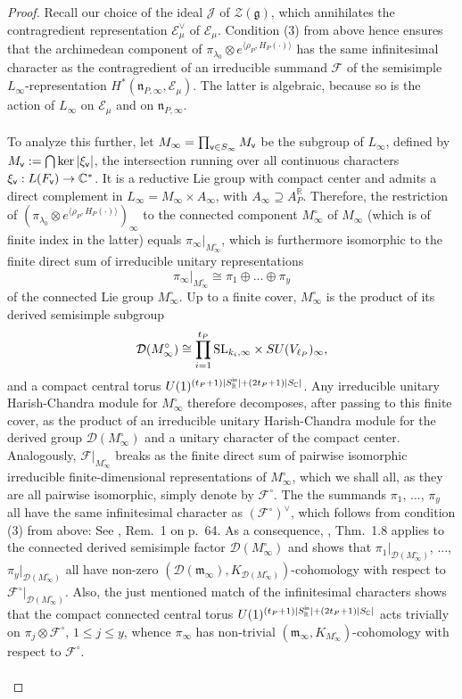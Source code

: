 \documentclass[a4paper,10pt]{amsart}
\theoremstyle{definition}
\numberwithin{equation}{section}
\def\R{\mathbb R}
\def\C{\mathbb C}
\def\EE{\mathcal E}
\def\cF{\mathcal F}
\def\g{\mathfrak g}
\def\n{\mathfrak n}
\def\m{\mathfrak m}
\def\vv{{\sf v}} %
\begin{document}
\begin{proof}
Recall our choice of the ideal $\mathcal J$ of $\mathcal Z(\g)$, which annihilates the contragredient representation $\EE_\mu^\vee$ of $\EE_\mu$. Condition (3) from above hence ensures that the archimedean component of $\pi_{\lambda_0}\otimes e^{\langle \rho_P,H_{P}(\cdot)\rangle}$ has the same infinitesimal character as the contragredient of an irreducible summand $\mathcal F$ of the semisimple $L_\infty$-representation $H^*(\n_{P,\infty},\EE_\mu)$. The latter is algebraic, because so is the action of $L_\infty$ on $\EE_\mu$ and on $\n_{P,\infty}$.\\\\ 
To analyze this further, let $M_\infty=\prod_{\vv\in S_\infty} M_\vv$ be the subgroup of $L_\infty$, defined by $M_\vv:=\bigcap \ker |\xi_\vv|$, the intersection running over all continuous characters $\xi_\vv:L(F_\vv)\rightarrow\C^*$. It is a reductive Lie group with compact center and admits a direct complement in $L_\infty=M_\infty\times A_\infty$, with $A_\infty\supseteq A_P^\R$. Therefore, the restriction of $(\pi_{\lambda_0}\otimes e^{\langle \rho_P,H_{P}(\cdot)\rangle})_\infty$ to the connected component $M_\infty^\circ$ of $M_\infty$ (which is of finite index in the latter) equals $\pi_\infty |_{M_\infty^\circ}$, which is furthermore isomorphic to the finite direct sum of irreducible unitary representations
$$\pi_\infty |_{M_\infty^\circ}\cong \pi_1\oplus...\oplus\pi_y$$
of the connected Lie group $M_\infty^\circ$. Up to a finite cover, $M^\circ_\infty$ is the product of its derived semisimple subgroup 
$$\mathcal D(M^\circ_\infty)\cong \prod_{i=1}^{t_P} {\rm SL}_{k_i,\infty}\times SU(V_{\ell_P})_\infty,$$ 
and a compact central torus $U(1)^{(t_P+1)|S^{\sf in}_\R|+(2t_P+1)|S_\C|}$. Any irreducible unitary Harish-Chandra module for $M^\circ_\infty$ therefore decomposes, after passing to this finite cover, as the product of an irreducible unitary Harish-Chandra module for the derived group $\mathcal D(M^\circ_\infty)$ and a unitary character of the compact center. Analogously, $\cF|_{M_\infty^\circ}$ breaks as the finite direct sum of pairwise isomorphic irreducible finite-dimensional representations of $M_\infty^{\circ}$, which we shall all, as they are all pairwise isomorphic, simply denote by $\cF^{\circ}$. The the summands $\pi_1$, ..., $\pi_y$ all have the same infinitesimal character as $(\cF^\circ)^\vee$, which follows from condition (3) from above: See \cite{bowa}, Rem.\ 1 on p.\ 64. As a consequence, \cite{salamribsu}, Thm.\ 1.8 applies to the connected derived semisimple factor $\mathcal D(M^\circ_\infty)$ and shows that $\pi_1|_{\mathcal D(M^\circ_\infty)}$, ..., $\pi_y|_{\mathcal D(M^\circ_\infty)}$ all have non-zero $(\mathcal D(\m_\infty), K_{\mathcal D(M^\circ_\infty)})$-cohomology with respect to $\cF^{\circ}|_{\mathcal D(M^\circ_\infty)}$. Also, the just mentioned match of the infinitesimal characters shows that the compact connected central torus $U(1)^{(t_P+1)|S^{\sf in}_\R|+(2t_P+1)|S_\C|}$ acts trivially on $\pi_j\otimes \cF^{\circ}$, $1\leq j\leq y$, whence $\pi_\infty$ has non-trivial $(\m_\infty, K_{M^\circ_\infty})$-cohomology with respect to $\cF^\circ$.\\\\ 

\end{proof}
\end{document}
